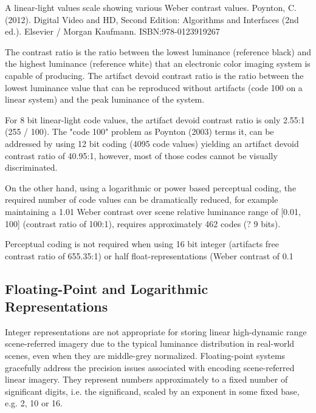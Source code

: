 A linear-light values scale showing various Weber contrast values.
Poynton, C. (2012). Digital Video and HD, Second Edition: Algorithms and Interfaces (2nd ed.). Elsevier / Morgan Kaufmann. ISBN:978-0123919267


The contrast ratio is the ratio between the lowest luminance (reference black) and the highest luminance (reference white) that an electronic color imaging system is capable of producing. The artifact devoid contrast ratio is the ratio between the lowest luminance value that can be reproduced without artifacts (code 100 on a linear system) and the peak luminance of the system.

For 8 bit linear-light code values, the artifact devoid contrast ratio is only 2.55:1 (255 / 100). The "code 100" problem as Poynton (2003) terms it, can be addressed by using 12 bit coding (4095 code values) yielding an artifact devoid contrast ratio of 40.95:1, however, most of those codes cannot be visually discriminated.

On the other hand, using a logarithmic or power based perceptual coding, the required number of code values can be dramatically reduced, for example maintaining a 1.01 Weber contrast over scene relative luminance range of [0.01, 100] (contrast ratio of 100:1), requires approximately 462 codes (? 9 bits).


Perceptual coding is not required when using 16 bit integer (artifacts free contrast ratio of 655.35:1) or half float-representations (Weber contrast of 0.1%

\subsection{Floating-Point and Logarithmic Representations}%
\label{subsec:floating-point-and-logarithmic-representations}

Integer representations are not appropriate for storing linear high-dynamic range scene-referred imagery due to the typical luminance distribution in real-world scenes, even when they are middle-grey normalized. Floating-point systems gracefully address the precision issues associated with encoding scene-referred linear imagery. They represent numbers approximately to a fixed number of significant digits, i.e. the significand, scaled by an exponent in some fixed base, e.g. 2, 10 or 16.

